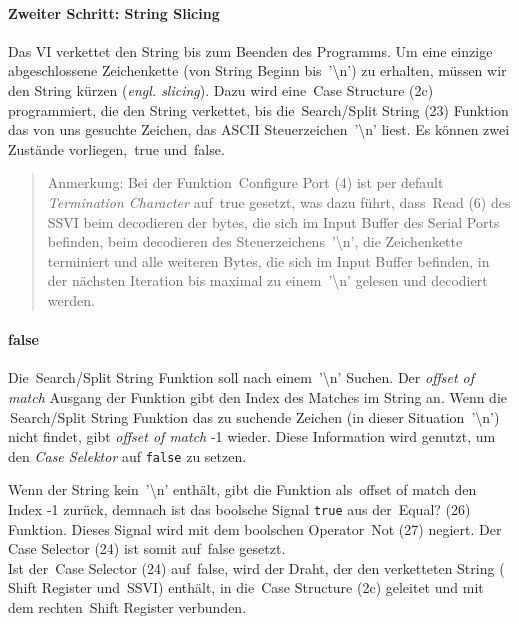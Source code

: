 {\paragraph{Zweiter Schritt: \glqq String Slicing\grqq} Das VI verkettet den String bis zum Beenden des Programms. Um eine einzige abgeschlossene Zeichenkette (von String Beginn bis \,{\Menlo '\textbackslash n'}) zu erhalten, müssen wir den String kürzen (\textit{engl. slicing}). Dazu wird eine \,{\Menlo Case Structure} (2c) programmiert, die den String verkettet, bis die \,{\Menlo Search/Split String} (23) Funktion das von uns gesuchte Zeichen, das ASCII Steuerzeichen \,{\Menlo '\textbackslash n'} liest. Es können zwei Zustände vorliegen, \,{\Menlo true} und \,{\Menlo false}. 

\begin{quote}
Anmerkung: Bei der Funktion \,{\Menlo Configure Port} (4) ist per default \textit{Termination Character} auf \,{\Menlo true} gesetzt, was dazu führt, dass \,{\Menlo Read} (6) des SSVI beim decodieren der bytes, die sich im Input Buffer des Serial Ports befinden, beim decodieren des Steuerzeichens  \,{\Menlo '\textbackslash n'}, die Zeichenkette terminiert und alle weiteren Bytes, die sich im Input Buffer befinden, in der nächsten Iteration bis maximal zu einem \,{\Menlo '\textbackslash n'} gelesen und decodiert werden.
\end{quote}


\paragraph*{false} Die \,{\Menlo Search/Split String} Funktion soll nach einem \,{\Menlo '\textbackslash n'} Suchen. Der \textit{offset of match} Ausgang der Funktion gibt den Index des Matches im String an. Wenn die \,{\Menlo Search/Split String} Funktion das zu suchende Zeichen (in dieser Situation \,{\Menlo  '\textbackslash n'}) nicht findet, gibt \textit{offset of match} -1 wieder. Diese Information wird genutzt, um den \textit{Case Selektor} auf \texttt{false} zu setzen. 

Wenn der String kein \,{\Menlo '\textbackslash n'} enthält, gibt die Funktion als \,{\Menlo offset of match} den Index -1 zurück, demnach ist das boolsche Signal \texttt{true} aus der \,{\Menlo Equal?} (26) Funktion. Dieses Signal wird mit dem boolschen Operator \,{\Menlo Not} (27) negiert. Der \,{\Menlo Case Selector} (24) ist somit auf \,{\Menlo false} gesetzt.\\
Ist der \,{\Menlo Case Selector} (24) auf \,{\Menlo false}, wird der Draht, der den verketteten String (\,{\Menlo Shift Register} und \,{\Menlo SSVI}) enthält, in die \,{\Menlo Case Structure} (2c) geleitet und mit dem rechten \,{\Menlo Shift Register} verbunden.\newline

}

